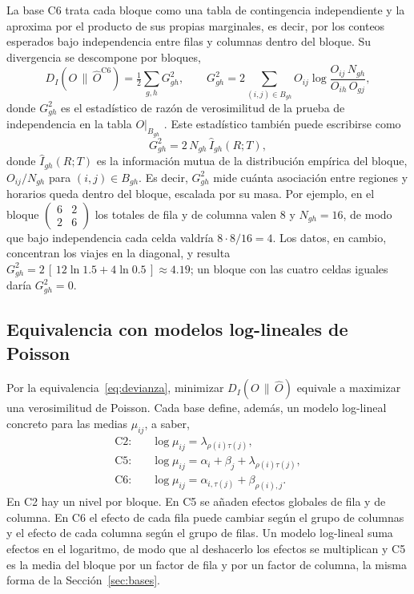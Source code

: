 La base C6 trata cada bloque como una tabla de contingencia independiente y la
aproxima por el producto de sus propias marginales, es decir, por los conteos
esperados bajo independencia entre filas y columnas dentro del bloque. Su
divergencia se descompone por bloques,
\begin{equation}\label{eq:c6-g2}
  D_I\!\left(O \,\|\, \hat{O}^{\mathrm{C6}}\right)
  = \tfrac{1}{2} \sum_{g,h} G^2_{gh}, \qquad
  G^2_{gh} = 2 \sum_{(i,j) \in B_{gh}} O_{ij} \log \frac{O_{ij}\, N_{gh}}{O_{ih}\, O_{gj}},
\end{equation}
donde $G^2_{gh}$ es el estadístico de razón de verosimilitud de la prueba de
independencia en la tabla $O|_{B_{gh}}$ \citep[Sec.~3.2.1, ec.~3.11]{Agresti2013}.
Este estadístico también puede escribirse como
\begin{equation}\label{eq:g2-im}
  G^2_{gh} = 2\, N_{gh}\, \hat{I}_{gh}(R;T),
\end{equation}
donde $\hat{I}_{gh}(R;T)$ es la información mutua de la distribución empírica del
bloque, $O_{ij}/N_{gh}$ para $(i,j) \in B_{gh}$. Es decir, $G^2_{gh}$ mide cuánta
asociación entre regiones y horarios queda dentro del bloque, escalada por su masa.
Por ejemplo, en el bloque
$\begin{pmatrix} 6 & 2 \\ 2 & 6 \end{pmatrix}$ los totales de fila y de columna
valen $8$ y $N_{gh} = 16$, de modo que bajo independencia cada celda valdría
$8 \cdot 8 / 16 = 4$. Los datos, en cambio, concentran los viajes en la diagonal, y
resulta $G^2_{gh} = 2\,[\,12 \ln 1.5 + 4 \ln 0.5\,] \approx 4.19$; un bloque con
las cuatro celdas iguales daría $G^2_{gh} = 0$.

\subsection{Equivalencia con modelos log-lineales de Poisson}\label{sec:loglineal}

Por la equivalencia~\eqref{eq:devianza}, minimizar $D_I(O \,\|\, \hat{O})$ equivale a
maximizar una verosimilitud de Poisson. Cada base define, además, un modelo
log-lineal concreto para las medias $\mu_{ij}$, a saber,
\begin{align}
  \text{C2:}\quad & \log \mu_{ij} = \lambda_{\rho(i)\tau(j)}, \label{eq:ll-c2}\\
  \text{C5:}\quad & \log \mu_{ij} = \alpha_i + \beta_j + \lambda_{\rho(i)\tau(j)}, \label{eq:ll-c5}\\
  \text{C6:}\quad & \log \mu_{ij} = \alpha_{i,\tau(j)} + \beta_{\rho(i),j}. \label{eq:ll-c6}
\end{align}
En C2 hay un nivel por bloque. En C5 se añaden efectos globales de fila y de
columna. En C6 el efecto de cada fila puede cambiar según el grupo de columnas y
el efecto de cada columna según el grupo de filas. Un modelo log-lineal suma
efectos en el logaritmo, de modo que al deshacerlo los efectos se multiplican y C5
es la media del bloque por un factor de fila y por un factor de columna, la misma
forma de la Sección~\ref{sec:bases}.

